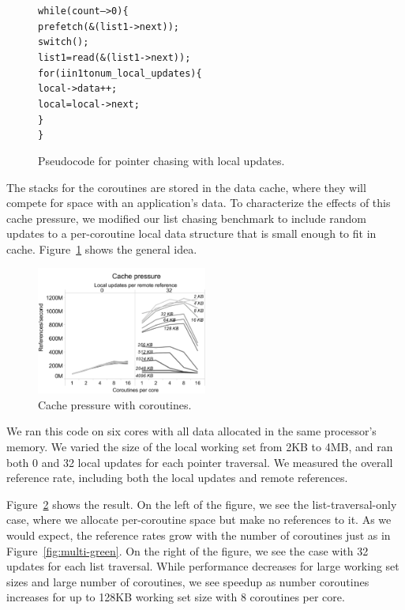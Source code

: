 \documentclass{acm_proc_article-sp}
\begin{document}
\begin{figure}
\begin{alltt}
  while (count-- > 0) \{
    prefetch(&(list1->next));
    switch();
    list1 = read(&(list1->next));
    for( i in 1 to num_local_updates ) \{
      local->data++;
      local = local->next;
   \}
  \}
\end{alltt}
\caption{Pseudocode for pointer chasing with local updates.}
\label{pointerupdate}
\end{figure}

The stacks for the coroutines are stored in the data cache, where they
will compete for space with an application's data. To characterize the
effects of this cache pressure, we modified our list chasing benchmark
to include random updates to a per-coroutine local data structure that
is small enough to fit in cache. Figure~\ref{pointerupdate} shows the
general idea.


\begin{figure}[h]
  \begin{center}
    \includegraphics[width=0.5\textwidth]{figures/cache-pressure-edited.pdf}
  \end{center}
  \caption{Cache pressure with coroutines.}
  \label{fig:cache-pressure}
\end{figure}

We ran this code on six cores with all data allocated in the same
processor's memory. We varied the size of the local working set from 2KB
to 4MB, and ran both 0 and 32 local updates for each pointer
traversal. We measured the overall reference rate, including both the local updates and remote references.

Figure~\ref{fig:cache-pressure} shows the result. On the left of the
figure, we see the list-traversal-only case, where we allocate
per-coroutine space but make no references to it. As we would expect,
the reference rates grow with the number of coroutines just as in
Figure~\ref{fig:multi-green}. On the right of the figure, we see the
case with 32 updates for each list traversal. While performance
decreases for large working set sizes and large number of coroutines,
we see speedup as number coroutines increases for up to 128KB working set size with 8 coroutines per
core.
\end{document}
